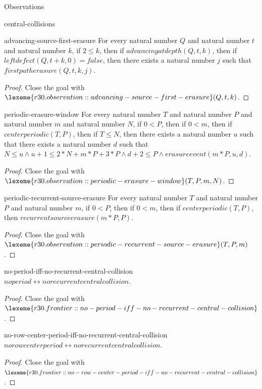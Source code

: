 \begin{lexlean}{Observations}
\begin{section}{central-collisions}
\begin{theorem}{advancing-source-first-erasure}
For every natural number \(Q\) and natural number \(t\) and natural number \(k\), if \(2 ≤ k\), then if \(advancingatdepth(Q, t, k)\), then if \(leftdefect(Q, t + k, 0) = false\), then there exists a natural number \(j\) such that \(firstpatherasure(Q, t, k, j)\).
\begin{proof}
Close the goal with \(\lexeme{r30.observation::advancing-source-first-erasure}(Q, t, k)\).
\end{proof}
\end{theorem}

\begin{theorem}{periodic-erasure-window}
For every natural number \(T\) and natural number \(P\) and natural number \(m\) and natural number \(N\), if \(0 < P\), then if \(0 < m\), then if \(centerperiodic(T, P)\), then if \(T ≤ N\), then there exists a natural number \(u\) such that there exists a natural number \(d\) such that \(N ≤ u ∧ u + 1 ≤ 2 * N + m * P + 3 * P ∧ d + 2 ≤ P ∧ erasureevent(m * P, u, d)\).
\begin{proof}
Close the goal with \(\lexeme{r30.observation::periodic-erasure-window}(T, P, m, N)\).
\end{proof}
\end{theorem}

\begin{theorem}{periodic-recurrent-source-erasure}
For every natural number \(T\) and natural number \(P\) and natural number \(m\), if \(0 < P\), then if \(0 < m\), then if \(centerperiodic(T, P)\), then \(recurrentsourceerasure(m * P, P)\).
\begin{proof}
Close the goal with \(\lexeme{r30.observation::periodic-recurrent-source-erasure}(T, P, m)\).
\end{proof}
\end{theorem}

\begin{theorem}{no-period-iff-no-recurrent-central-collision}
\(noperiod ↔ norecurrentcentralcollision\).
\begin{proof}
Close the goal with \(\lexeme{r30.frontier::no-period-iff-no-recurrent-central-collision}\).
\end{proof}
\end{theorem}

\begin{theorem}{no-row-center-period-iff-no-recurrent-central-collision}
\(norowcenterperiod ↔ norecurrentcentralcollision\).
\begin{proof}
Close the goal with \(\lexeme{r30.frontier::no-row-center-period-iff-no-recurrent-central-collision}\).
\end{proof}
\end{theorem}


\end{section}
\end{lexlean}
